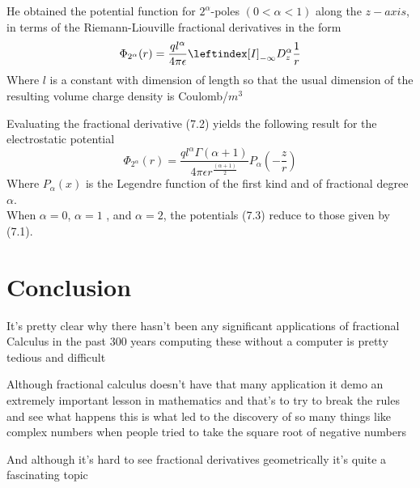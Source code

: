 He obtained the potential function for $2^{\alpha}$-poles $(0 < \alpha < 1)$ along
the $z-axis$, in terms of the Riemann-Liouville fractional derivatives in the form
\begin{equation}
    \Phi_{2^{\alpha}}(r) = \frac{q l^{\alpha}}{4\pi \epsilon} \leftindex[I]_{-\infty}{D_z^{\alpha}} \frac{1}{r}
\end{equation}
Where $l$ is a constant with dimension of length so that the usual
dimension of the resulting volume charge density is Coulomb/$m^3$

Evaluating the fractional derivative (7.2) yields the following result for the electrostatic potential
\begin{equation}
    \Phi_{2^{\alpha}}(r) = \frac{q l^{\alpha} \Gamma(\alpha+1)}{4\pi\epsilon r^{\frac{(\alpha+1)}{2}}}  P_{\alpha}\left(-\frac{z}{r}\right)
\end{equation}
Where $P_{\alpha}(x)$ is the Legendre function of the first kind and of fractional degree $\alpha$.
\\
When $\alpha = 0$, $\alpha = 1$ , and $\alpha = 2$, the potentials (7.3) reduce to those given by (7.1).




\vspace*{\fill}


\section*{\LARGE Conclusion}
It's pretty clear why there hasn't been any significant 
applications of fractional Calculus in the past 300 years 
computing these without a computer is pretty tedious and difficult 

Although fractional calculus doesn't have that many application it demo an extremely important lesson in mathematics and that's 
to try to break the rules and see what happens this is what led to the discovery of so many things like complex numbers 
when people tried to take the square root of negative numbers 

And although it's hard to see fractional derivatives geometrically it's quite a fascinating topic